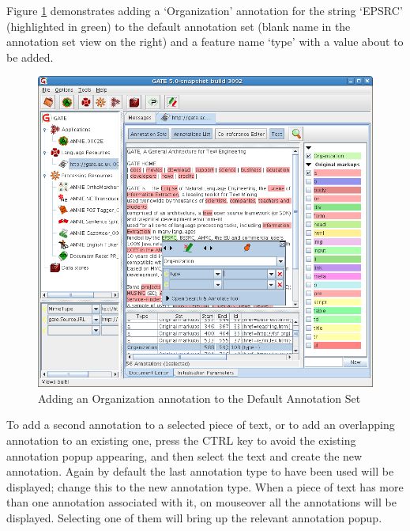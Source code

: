 Figure \ref{fig:addAnOrganization} demonstrates adding a `Organization'
annotation for the string `EPSRC' (highlighted in green) to the default
annotation set (blank name in the annotation set view on the right) and a
feature name `type' with a value about to be added.

\begin{figure}[htb]
\begin{center}
\includegraphics[scale=0.5]{mainWindow.png}
\end{center}
\caption{Adding an Organization annotation to the Default Annotation
Set} \label{fig:addAnOrganization}
\end{figure}

To add a second annotation to a selected piece of text, or to add an overlapping
annotation to an existing one, press the CTRL key to avoid the existing
annotation popup appearing, and then select the text and create the new
annotation. Again by default the last annotation type to have been used will be
displayed; change this to the new annotation type. When a piece of text has more
than one annotation associated with it, on mouseover all the annotations will be
displayed. Selecting one of them will bring up the relevant annotation popup.

